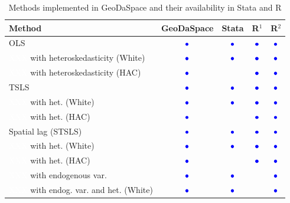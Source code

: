 \documentclass{article}
\begin{document}
\begin{table}[htpb]
\caption{Methods implemented in GeoDaSpace and their availability in Stata and R}
\label{t:methods}
\centering
\begin{small}
\begin{tabular}{l|cccc} \hline
\textbf{Method}&\textbf{GeoDaSpace}&\textbf{Stata}&\textbf{R$^1$}&\textbf{R$^2$}\\ \hline
OLS&{\LARGE$\textcolor{blue}\bullet$}&{\LARGE$\textcolor{blue}\bullet$}&{\LARGE$\textcolor{blue}\bullet$}&{\LARGE$\textcolor{blue}\bullet$}\\
\textcolor{white}{XXX} with heteroskedasticity (White)&{\LARGE$\textcolor{blue}\bullet$}&{\LARGE$\textcolor{blue}\bullet$}&{\LARGE$\textcolor{blue}\bullet$}&{\LARGE$\textcolor{blue}\bullet$}\\
\textcolor{white}{XXX} with heteroskedasticity (HAC)&{\LARGE$\textcolor{blue}\bullet$}&&{\LARGE$\textcolor{blue}\bullet$}&{\LARGE$\textcolor{blue}\bullet$}\\
TSLS&{\LARGE$\textcolor{blue}\bullet$}&{\LARGE$\textcolor{blue}\bullet$}&{\LARGE$\textcolor{blue}\bullet$}&{\LARGE$\textcolor{blue}\bullet$}\\
\textcolor{white}{XXX} with het. (White)&{\LARGE$\textcolor{blue}\bullet$}&{\LARGE$\textcolor{blue}\bullet$}&{\LARGE$\textcolor{blue}\bullet$}&{\LARGE$\textcolor{blue}\bullet$}\\
\textcolor{white}{XXX} with het. (HAC)&{\LARGE$\textcolor{blue}\bullet$}&&{\LARGE$\textcolor{blue}\bullet$}&{\LARGE$\textcolor{blue}\bullet$}\\
Spatial lag (STSLS)&{\LARGE$\textcolor{blue}\bullet$}&{\LARGE$\textcolor{blue}\bullet$}&{\LARGE$\textcolor{blue}\bullet$}&{\LARGE$\textcolor{blue}\bullet$}\\
\textcolor{white}{XXX} with het. (White)&{\LARGE$\textcolor{blue}\bullet$}&{\LARGE$\textcolor{blue}\bullet$}&{\LARGE$\textcolor{blue}\bullet$}&{\LARGE$\textcolor{blue}\bullet$}\\
\textcolor{white}{XXX} with het. (HAC)&{\LARGE$\textcolor{blue}\bullet$}&&{\LARGE$\textcolor{blue}\bullet$}&{\LARGE$\textcolor{blue}\bullet$}\\
\textcolor{white}{XXX} with endogenous var.&{\LARGE$\textcolor{blue}\bullet$}&{\LARGE$\textcolor{blue}\bullet$}&&{\LARGE$\textcolor{blue}\bullet$}\\
\textcolor{white}{XXX} with endog. var. and het. (White)&{\LARGE$\textcolor{blue}\bullet$}&{\LARGE$\textcolor{blue}\bullet$}&&{\LARGE$\textcolor{blue}\bullet$}\\

\end{tabular}
\end{small}
\end{table}
\end{document}
